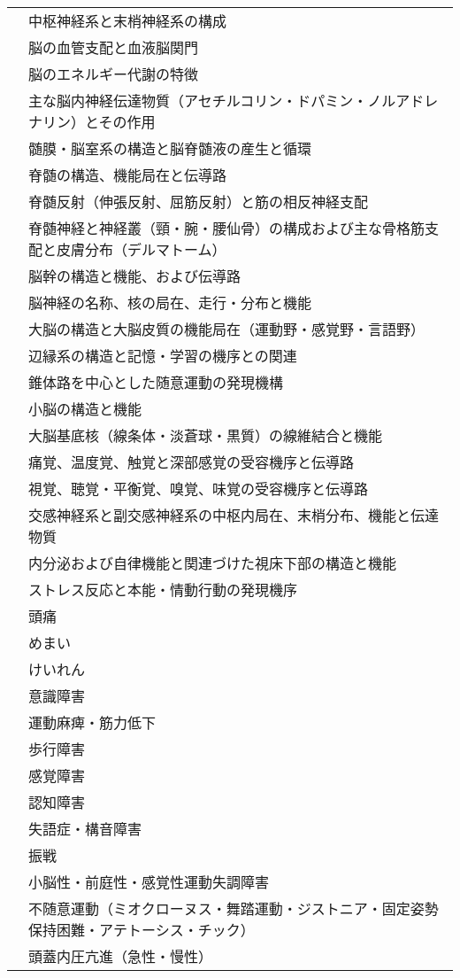 \begin{xltabular}{\linewidth}{XX}
 & 中枢神経系と末梢神経系の構成 \\
 & 脳の血管支配と血液脳関門 \\
 & 脳のエネルギー代謝の特徴 \\
 & 主な脳内神経伝達物質（アセチルコリン・ドパミン・ノルアドレナリン）とその作用 \\
 & 髄膜・脳室系の構造と脳脊髄液の産生と循環 \\
 & 脊髄の構造、機能局在と伝導路 \\
 & 脊髄反射（伸張反射、屈筋反射）と筋の相反神経支配 \\
 & 脊髄神経と神経叢（頸・腕・腰仙骨）の構成および主な骨格筋支配と皮膚分布（デルマトーム） \\
 & 脳幹の構造と機能、および伝導路 \\
 & 脳神経の名称、核の局在、走行・分布と機能 \\
 & 大脳の構造と大脳皮質の機能局在（運動野・感覚野・言語野） \\
 & 辺縁系の構造と記憶・学習の機序との関連 \\
 & 錐体路を中心とした随意運動の発現機構 \\
 & 小脳の構造と機能 \\
 & 大脳基底核（線条体・淡蒼球・黒質）の線維結合と機能 \\
 & 痛覚、温度覚、触覚と深部感覚の受容機序と伝導路 \\
 & 視覚、聴覚・平衡覚、嗅覚、味覚の受容機序と伝導路 \\
 & 交感神経系と副交感神経系の中枢内局在、末梢分布、機能と伝達物質 \\
 & 内分泌および自律機能と関連づけた視床下部の構造と機能 \\
 & ストレス反応と本能・情動行動の発現機序 \\
 & 頭痛 \\
 & めまい \\
 & けいれん \\
 & 意識障害 \\
 & 運動麻痺・筋力低下 \\
 & 歩行障害 \\
 & 感覚障害 \\
 & 認知障害 \\
 & 失語症・構音障害 \\
 & 振戦 \\
 & 小脳性・前庭性・感覚性運動失調障害 \\
 & 不随意運動（ミオクローヌス・舞踏運動・ジストニア・固定姿勢保持困難・アテトーシス・チック） \\
 & 頭蓋内圧亢進（急性・慢性） \\

\end{xltabular}
